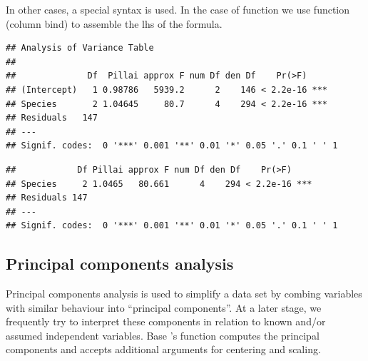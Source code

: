 \documentclass[krantz2]{krantz}\usepackage{knitr}%
\begin{document}
In other cases, a special syntax is used. In the case of function  we use function  (column bind) to assemble the lhs of the formula.
\begin{knitrout}\footnotesize
{}\color{fgcolor}\begin{kframe}
\begin{alltt}
 \hlkwb{<-} \hlstd{(} \hlopt{~}    
\end{alltt}
\begin{verbatim}
## Analysis of Variance Table
## 
##              Df  Pillai approx F num Df den Df    Pr(>F)    
## (Intercept)   1 0.98786   5939.2      2    146 < 2.2e-16 ***
## Species       2 1.04645     80.7      4    294 < 2.2e-16 ***
## Residuals   147                                             
## ---
## Signif. codes:  0 '***' 0.001 '**' 0.01 '*' 0.05 '.' 0.1 ' ' 1
\end{verbatim}
\begin{alltt}
\end{alltt}
\begin{verbatim}
##            Df Pillai approx F num Df den Df    Pr(>F)    
## Species     2 1.0465   80.661      4    294 < 2.2e-16 ***
## Residuals 147                                            
## ---
## Signif. codes:  0 '***' 0.001 '**' 0.01 '*' 0.05 '.' 0.1 ' ' 1
\end{verbatim}
\end{kframe}
\end{knitrout}

\subsection{Principal components analysis}\label{sec:stat:PCA}

Principal components analysis is used to simplify a data set by combing variables with similar behaviour into ``principal components''. At a later stage, we frequently try to interpret these components in relation to known and/or assumed independent variables. Base \Rlang's function  computes the principal components and accepts additional arguments for centering and scaling.

\begin{knitrout}\footnotesize
{}\color{fgcolor}\begin{kframe}
\begin{alltt}
 \hlkwb{<-} \hlstd{(iris[}\hlstd{(}\hlstd{,} \hlstd{,}
                    \hlstd{,} \hlstd{)],}
              \hlstd{=} \hlstd{,}
              \hlstd{=} \hlstd{)}
\end{alltt}
\end{kframe}
\end{knitrout}
\end{document}
